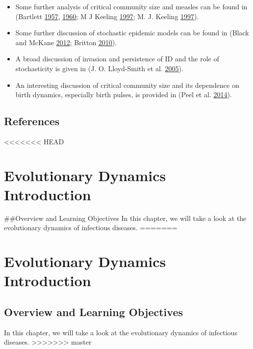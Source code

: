 \documentclass[]{book}
\providecommand{\tightlist}{%
  \setlength{\itemsep}{0pt}\setlength{\parskip}{0pt}}
\theoremstyle{definition}
\theoremstyle{definition}
\theoremstyle{definition}
\theoremstyle{remark}
\begin{document}
\begin{itemize}
\tightlist
\item
  Some further analysis of critical community size and measles can be
  found in (Bartlett \protect\hyperlink{ref-bartlett57}{1957},
  \protect\hyperlink{ref-bartlett60}{1960}; M J Keeling
  \protect\hyperlink{ref-keeling97}{1997}; M. J. Keeling
  \protect\hyperlink{ref-keeling97a}{1997}).
\item
  Some further discussion of stochastic epidemic models can be found in
  (Black and McKane \protect\hyperlink{ref-black12}{2012}; Britton
  \protect\hyperlink{ref-britton10a}{2010}).
\item
  A broad discussion of invasion and persistence of ID and the role of
  stochasticity is given in (J. O. Lloyd-Smith et al.
  \protect\hyperlink{ref-lloyd-smith05b}{2005}).
\item
  An interesting discussion of critical community size and its
  dependence on birth dynamics, especially birth pulses, is provided in
  (Peel et al. \protect\hyperlink{ref-peel14}{2014}).
\end{itemize}

\hypertarget{references-2}{%
\section{References}\label{references-2}}

<<<<<<< HEAD
\hypertarget{evolutionary-dynamics-introduction}{%
\chapter{Evolutionary Dynamics
Introduction}\label{evolutionary-dynamics-introduction}}

\#\#Overview and Learning Objectives In this chapter, we will take a
look at the evolutionary dynamics of infectious diseases.
=======
\chapter{Evolutionary Dynamics
Introduction}\label{evolutionary-dynamics-introduction}

\section{Overview and Learning
Objectives}\label{overview-and-learning-objectives-13}

In this chapter, we will take a look at the evolutionary dynamics of
infectious diseases.
>>>>>>> master
\end{document}
